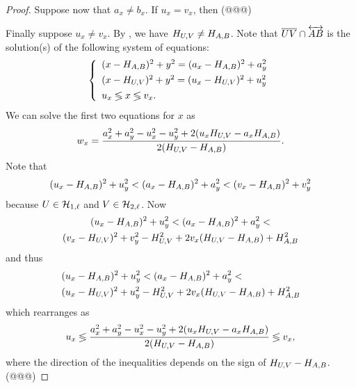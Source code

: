 \begin{proof}
Suppose now that \(a_x \neq b_x\).
If \(u_x = v_x\), then (@@@)

Finally suppose \(u_x \neq v_x\).
By , we have \(H_{U,V} \neq H_{A,B}\).
Note that \(\overline{UV} \cap \overleftrightarrow{AB}\) is the solution(s) of the following system of equations: \[ \left\{ \begin{array}{l} (x - H_{A,B})^2 + y^2 = (a_x - H_{A,B})^2 + a_y^2 \\[4pt] (x - H_{U,V})^2 + y^2 = (u_x - H_{U,V})^2 + u_y^2 \\[4pt] u_x \lessgtr x \lessgtr v_x. \end{array} \right. \]
We can solve the first two equations for \(x\) as \[ w_x = \frac{a_x^2 + a_y^2 - u_x^2 - u_y^2 + 2(u_xH_{U,V} - a_xH_{A,B})}{2(H_{U,V} - H_{A,B})}. \]
Note that \[ (u_x - H_{A,B})^2 + u_y^2 < (a_x - H_{A,B})^2 + a_y^2 < (v_x - H_{A,B})^2 + v_y^2 \] because \(U \in \mathcal{H}_{1,\ell}\) and \(V \in \mathcal{H}_{2,\ell}\).
Now
\begin{multline*}
(u_x - H_{A,B})^2 + u_y^2 < (a_x - H_{A,B})^2 + a_y^2 < \\
  (v_x - H_{U,V})^2 + v_y^2 - H_{U,V}^2 + 2v_x(H_{U,V} - H_{A,B}) + H_{A,B}^2
\end{multline*}
and thus
\begin{multline*}
(u_x - \HHPIDEALPOINT{A}{B})^2 + u_y^2 < (a_x - \HHPIDEALPOINT{A}{B})^2 + a_y^2 < \hfill \\
  (u_x - \HHPIDEALPOINT{U}{V})^2 + u_y^2 - \HHPIDEALPOINT{U}{V}^2 + 2v_x(\HHPIDEALPOINT{U}{V} - \HHPIDEALPOINT{A}{B}) + \HHPIDEALPOINT{A}{B}^2
\end{multline*}
which rearranges as \[ u_x \lessgtr \frac{a_x^2 + a_y^2 - u_x^2 - u_y^2 + 2(u_xH_{U,V} - a_xH_{A,B})}{2(H_{U,V} - H_{A,B})} \lessgtr v_x, \] where the direction of the inequalities depends on the sign of \(H_{U,V} - H_{A,B}\).
(@@@)
\end{proof}
